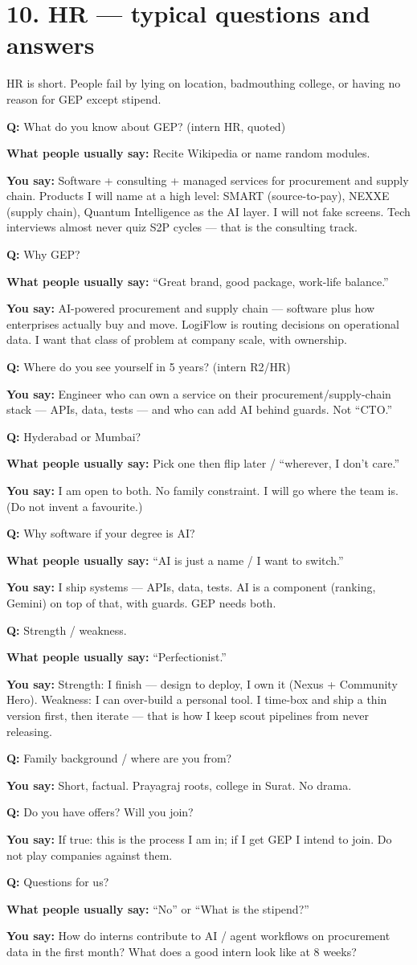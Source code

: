 \documentclass[a4paper,9.5pt]{extarticle}
\newcommand{\Q}[1]{\par\vspace{1.5pt}\noindent\textcolor{hot}{\textbf{Q:} #1}\par}
\newcommand{\Typ}[1]{\noindent\textcolor{muted}{\textbf{What people usually say:} #1}\par}
\newcommand{\Say}[1]{\noindent\textcolor{ok}{\textbf{You say:} #1}\par}
\begin{document}
\section{10. HR --- typical questions and answers}
HR is short. People fail by lying on location, badmouthing college, or having no reason for GEP except stipend.

\Q{What do you know about GEP? (intern HR, quoted)}
\Typ{Recite Wikipedia or name random modules.}
\Say{Software + consulting + managed services for procurement and supply chain. Products I will name at a high level: SMART (source-to-pay), NEXXE (supply chain), Quantum Intelligence as the AI layer. I will not fake screens. Tech interviews almost never quiz S2P cycles --- that is the consulting track.}

\Q{Why GEP?}
\Typ{``Great brand, good package, work-life balance.''}
\Say{AI-powered procurement and supply chain --- software plus how enterprises actually buy and move. LogiFlow is routing decisions on operational data. I want that class of problem at company scale, with ownership.}

\Q{Where do you see yourself in 5 years? (intern R2/HR)}
\Say{Engineer who can own a service on their procurement/supply-chain stack --- APIs, data, tests --- and who can add AI behind guards. Not ``CTO.''}

\Q{Hyderabad or Mumbai?}
\Typ{Pick one then flip later / ``wherever, I don't care.''}
\Say{I am open to both. No family constraint. I will go where the team is. (Do not invent a favourite.)}

\Q{Why software if your degree is AI?}
\Typ{``AI is just a name / I want to switch.''}
\Say{I ship systems --- APIs, data, tests. AI is a component (ranking, Gemini) on top of that, with guards. GEP needs both.}

\Q{Strength / weakness.}
\Typ{``Perfectionist.''}
\Say{Strength: I finish --- design to deploy, I own it (Nexus + Community Hero). Weakness: I can over-build a personal tool. I time-box and ship a thin version first, then iterate --- that is how I keep scout pipelines from never releasing.}

\Q{Family background / where are you from?}
\Say{Short, factual. Prayagraj roots, college in Surat. No drama.}

\Q{Do you have offers? Will you join?}
\Say{If true: this is the process I am in; if I get GEP I intend to join. Do not play companies against them.}

\Q{Questions for us?}
\Typ{``No'' or ``What is the stipend?''}
\Say{How do interns contribute to AI / agent workflows on procurement data in the first month? What does a good intern look like at 8 weeks?}
\end{document}
